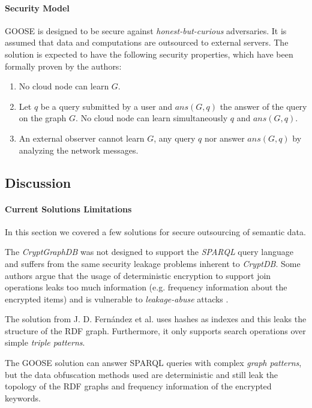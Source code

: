 \paragraph{Security Model}
\gls{GOOSE} is designed to be secure against \emph{honest-but-curious} adversaries. It is assumed that data and computations are outsourced to external servers. The solution is expected to have the following security properties, which have been formally proven by the authors: 

\begin{enumerate}
    \item No cloud node can learn $G$.
    \item Let $q$ be a query submitted by a user and $ans(G, q)$ the answer of the query on the graph $G$. No cloud node can learn simultaneously $q$ and $ans(G, q)$.
    \item An external observer cannot learn $G$, any query $q$ nor answer $ans(G, q)$ by analyzing the network messages.
\end{enumerate}

\subsection{Discussion}
\label{ch2:sec:semantic-data:discussion}

\paragraph{Current Solutions Limitations} In this section we covered a few solutions for secure outsourcing of semantic data.

The \emph{CryptGraphDB} \autocite{Aburawi2018-pq} was not designed to support the \emph{SPARQL} query language and suffers from the same security leakage problems inherent to \emph{CryptDB}. Some authors argue that the usage of deterministic encryption to support join operations leaks too much information (e.g. frequency information about the encrypted items) and is vulnerable to \emph{leakage-abuse} attacks \autocite{Jutla2021-af, Hahn2019-sg, Shafieinejad2021-rb}.

The solution from J. D. Fernández et al. \autocite{Fernandez2017-bh} uses hashes as indexes and this leaks the structure of the \gls{RDF} graph. Furthermore, it only supports search operations over simple \emph{triple patterns}.

The \gls{GOOSE} \autocite{Ciucanu2020-lx} solution can answer \gls{SPARQL} queries with complex \emph{graph patterns}, but the data obfuscation methods used are deterministic and still leak the topology of the \gls{RDF} graphs and frequency information of the encrypted keywords.

